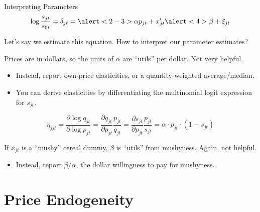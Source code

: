 \documentclass[aspectratio=169,t,11pt,table]{beamer}
\begin{document}
\begin{frame}{Interpreting Parameters}
    \vspace{-\baselineskip}
    \begin{equation*}
        \log\frac{s_{jt}}{s_{0t}} = \delta_{jt} = \alert<2-3>{\alpha} p_{jt} + x_{jt}'\alert<4>{\beta} + \xi_{jt}
    \end{equation*}
    \vspace{-0.5\baselineskip}
    \begin{wideitemize}
        \item Let's say we estimate this equation. How to interpret our parameter estimates?
        \pause
        \item Prices are in dollars, so the units of $\alpha$ are ``utils'' per dollar. Not very helpful.
        \pause
        \begin{itemize}
            \item Instead, report own-price elasticities, or a quantity-weighted average/median.
            \item You can derive elasticities by differentiating the multinomial logit expression for $s_{jt}$.
        \end{itemize}
        \vspace{\baselineskip}
        \begin{equation*}
            \eta_{jjt} = \frac{\partial\log q_{jt}}{\partial\log p_{jt}} = \frac{\partial q_{jt}}{\partial p_{jt}} \frac{p_{jt}}{q_{jt}} = \frac{\partial s_{jt}}{\partial p_{jt}} \frac{p_{jt}}{s_{jt}} = \alpha \cdot p_{jt} \cdot (1 - s_{jt})
        \end{equation*}
        \vspace{-0.5\baselineskip}
        \pause
        \item If $x_{jt}$ is a ``mushy'' cereal dummy, $\beta$ is ``utils'' from mushyness. Again, not helpful.
        \pause
        \begin{itemize}
            \item Instead, report $\beta / \alpha$, the dollar willingness to pay for mushyness.
        \end{itemize}
    \end{wideitemize}
\end{frame}

\section{Price Endogeneity}
\end{document}
